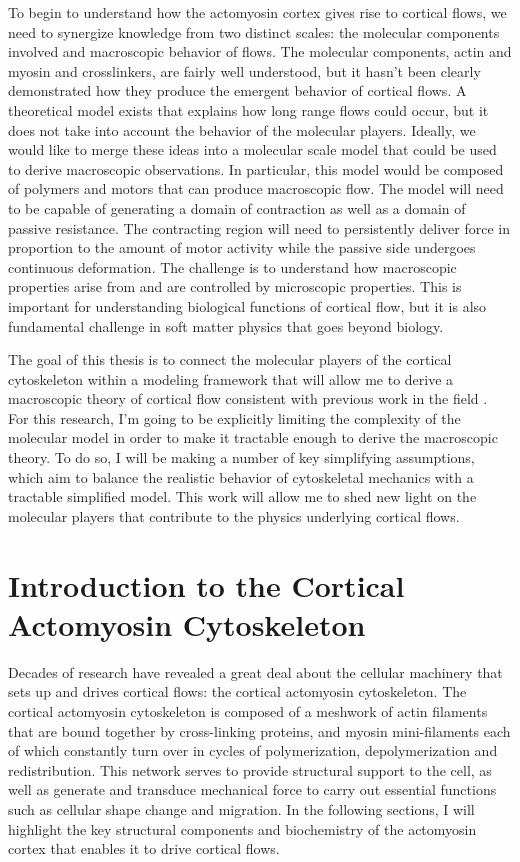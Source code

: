 To begin to understand how the actomyosin cortex gives rise to cortical flows, we need to  synergize knowledge from two distinct scales: the molecular components involved and macroscopic behavior of  flows.  The molecular components, actin and myosin and crosslinkers, are fairly well understood, but it hasn’t been clearly demonstrated how they produce the emergent behavior of cortical flows. A theoretical model exists that explains how long range flows could occur, but it does not take into account the behavior of the molecular players.  Ideally, we would like to merge these ideas into a molecular scale model that could be used to derive macroscopic observations. In particular, this model would be composed of polymers and motors that can produce macroscopic flow. The model will need to be capable of generating a domain of contraction as well as a domain of passive resistance. The contracting region will need to persistently deliver force in proportion to the amount of motor activity while the passive side undergoes continuous deformation. The challenge is to understand how macroscopic properties arise from and are controlled by microscopic properties.  This is important for understanding biological functions of cortical flow,  but it is also fundamental challenge in soft matter physics that goes beyond biology.

The goal of this thesis is to connect the molecular players of the cortical cytoskeleton within a modeling framework that will allow me to derive a macroscopic theory of cortical flow consistent with previous work in the field \cite{PhysRevLett.106.028103}. For this research, I'm going to be explicitly limiting the complexity of the molecular model in order to make it tractable enough to derive the macroscopic theory. To do so, I will be making a number of key simplifying assumptions, which aim to balance the realistic behavior of cytoskeletal mechanics with a tractable simplified model. This work will allow me to shed new light on the molecular players that contribute to the physics underlying cortical flows.


\section{Introduction to the Cortical Actomyosin Cytoskeleton}

Decades of research have revealed a great deal about the cellular machinery that  sets up and drives cortical flows: the cortical actomyosin cytoskeleton. The cortical actomyosin cytoskeleton is composed of a meshwork of actin filaments that are bound together by cross-linking proteins, and myosin mini-filaments each of which constantly turn over in cycles of polymerization, depolymerization and redistribution. This network serves to provide structural support to the cell, as well as generate and transduce mechanical force to carry out essential functions such as cellular shape change and migration.  In the following sections, I will highlight the key structural components and biochemistry of the actomyosin cortex that enables it to drive cortical flows.

